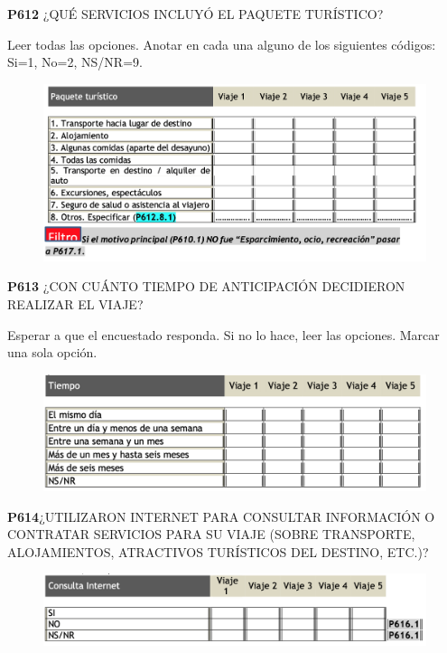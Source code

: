 \documentclass[
  openany]{book}
\begin{document}
\textbf{P612} ¿QUÉ SERVICIOS INCLUYÓ EL PAQUETE TURÍSTICO?

Leer todas las opciones. Anotar en cada una alguno de los siguientes códigos: Si=1, No=2, NS/NR=9.

\begin{figure}

{\centering \includegraphics[width=1\linewidth]{imagenes/figura6-220} 

}

\end{figure}

\textbf{P613} ¿CON CUÁNTO TIEMPO DE ANTICIPACIÓN DECIDIERON REALIZAR EL VIAJE?

Esperar a que el encuestado responda. Si no lo hace, leer las opciones. Marcar una sola opción.

\begin{figure}

{\centering \includegraphics[width=1\linewidth]{imagenes/figura6-221} 

}

\end{figure}

\textbf{P614}¿UTILIZARON INTERNET PARA CONSULTAR INFORMACIÓN O CONTRATAR SERVICIOS PARA SU VIAJE (SOBRE TRANSPORTE, ALOJAMIENTOS, ATRACTIVOS TURÍSTICOS DEL DESTINO, ETC.)?

\begin{figure}

{\centering \includegraphics[width=1\linewidth]{imagenes/figura6-222} 

}

\end{figure}
\end{document}
